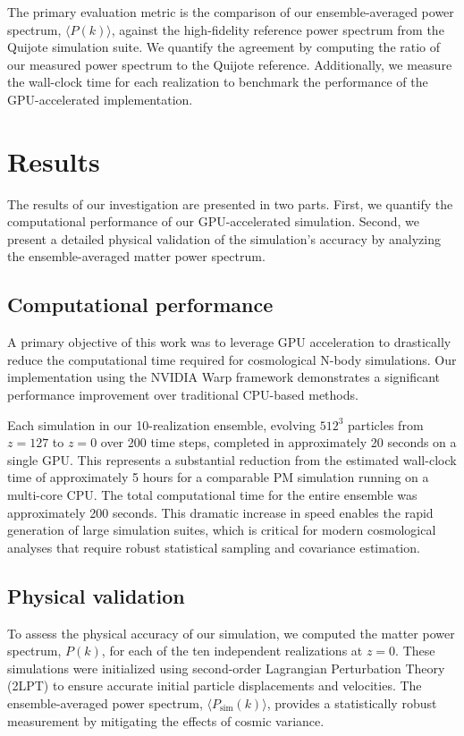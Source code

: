 \documentclass[]{article}
\begin{document}
The primary evaluation metric is the comparison of our ensemble-averaged power spectrum, $\langle P(k) \rangle$, against the high-fidelity reference power spectrum from the Quijote simulation suite. We quantify the agreement by computing the ratio of our measured power spectrum to the Quijote reference. Additionally, we measure the wall-clock time for each realization to benchmark the performance of the GPU-accelerated implementation.

\section{Results}
\label{sec:results}
The results of our investigation are presented in two parts. First, we quantify the computational performance of our GPU-accelerated simulation. Second, we present a detailed physical validation of the simulation's accuracy by analyzing the ensemble-averaged matter power spectrum.

\subsection{Computational performance}
A primary objective of this work was to leverage GPU acceleration to drastically reduce the computational time required for cosmological N-body simulations. Our implementation using the NVIDIA Warp framework demonstrates a significant performance improvement over traditional CPU-based methods.

Each simulation in our 10-realization ensemble, evolving $512^3$ particles from $z=127$ to $z=0$ over 200 time steps, completed in approximately 20 seconds on a single GPU. This represents a substantial reduction from the estimated wall-clock time of approximately 5 hours for a comparable PM simulation running on a multi-core CPU. The total computational time for the entire ensemble was approximately 200 seconds. This dramatic increase in speed enables the rapid generation of large simulation suites, which is critical for modern cosmological analyses that require robust statistical sampling and covariance estimation.

\subsection{Physical validation}
To assess the physical accuracy of our simulation, we computed the matter power spectrum, $P(k)$, for each of the ten independent realizations at $z=0$. These simulations were initialized using second-order Lagrangian Perturbation Theory (2LPT) to ensure accurate initial particle displacements and velocities. The ensemble-averaged power spectrum, $\langle P_{\text{sim}}(k) \rangle$, provides a statistically robust measurement by mitigating the effects of cosmic variance.
\end{document}
